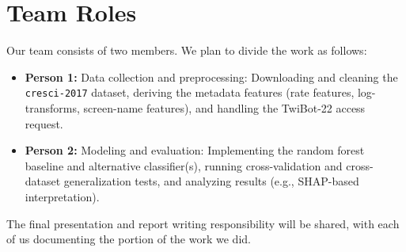 \documentclass[11pt]{article}
\begin{document}
\section{Team Roles}

Our team consists of two members. We plan to divide the work as follows:

\begin{itemize}
    \item \textbf{Person 1:} Data collection and preprocessing: Downloading and cleaning the \texttt{cresci-2017} dataset, deriving the metadata features (rate features, log-transforms, screen-name features), and handling the TwiBot-22 access request.
    \item \textbf{Person 2:} Modeling and evaluation: Implementing the random forest baseline and alternative classifier(s), running cross-validation and cross-dataset generalization tests, and analyzing results (e.g., SHAP-based interpretation).
\end{itemize}

The final presentation and report writing responsibility will be shared, with each of us documenting the portion of the work we did.
\end{document}
